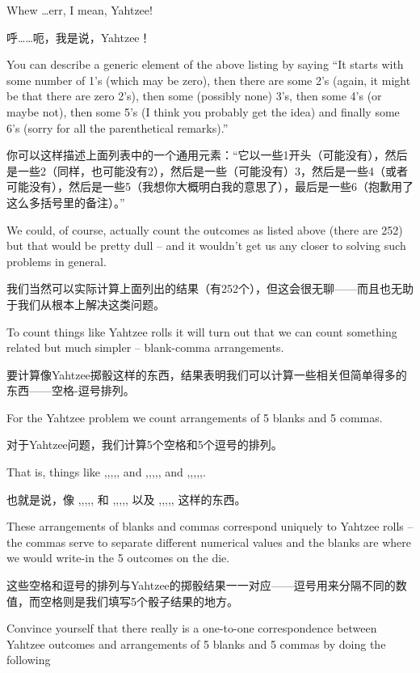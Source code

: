 Whew \ldots err, I mean, Yahtzee!

呼……呃，我是说，Yahtzee！

You can describe a generic element of the above listing by saying ``It starts
with some number of 1's (which may be zero), then there are some 2's (again,
it might be that there are zero 2's),  then some (possibly none) 3's, 
then some 4's (or maybe not), then some
5's (I think you probably get the idea) and finally some 6's (sorry for 
all the parenthetical remarks).''  

你可以这样描述上面列表中的一个通用元素：“它以一些1开头（可能没有），然后是一些2（同样，也可能没有2），然后是一些（可能没有）3，然后是一些4（或者可能没有），然后是一些5（我想你大概明白我的意思了），最后是一些6（抱歉用了这么多括号里的备注）。”

We could, of course, actually count the 
outcomes as listed above (there are 252) but that would be pretty dull -- and
it wouldn't get us any closer to solving such problems in general.

我们当然可以实际计算上面列出的结果（有252个），但这会很无聊——而且也无助于我们从根本上解决这类问题。

To 
count things like Yahtzee rolls it will turn out that we can count something
related but much simpler -- blank-comma arrangements.

要计算像Yahtzee掷骰这样的东西，结果表明我们可以计算一些相关但简单得多的东西——空格-逗号排列。

For the Yahtzee
problem we count arrangements of 5 blanks and 5 commas.

对于Yahtzee问题，我们计算5个空格和5个逗号的排列。

That is,
things like {\LARGE \blnk\blnk,\blnk,,\blnk,\blnk,} and 
{\LARGE \blnk\blnk\blnk\blnk\blnk,,,,,} and 
{\LARGE ,,,\blnk\blnk\blnk\blnk\blnk,,}.

也就是说，像 {\LARGE \blnk\blnk,\blnk,,\blnk,\blnk,} 和 {\LARGE \blnk\blnk\blnk\blnk\blnk,,,,,} 以及 {\LARGE ,,,\blnk\blnk\blnk\blnk\blnk,,} 这样的东西。

These arrangements of blanks and commas correspond uniquely to Yahtzee
rolls -- the commas serve to separate different numerical values
and the blanks are where we would write-in the 5 outcomes on the die.

这些空格和逗号的排列与Yahtzee的掷骰结果一一对应——逗号用来分隔不同的数值，而空格则是我们填写5个骰子结果的地方。

Convince yourself that there really is a one-to-one correspondence
between Yahtzee outcomes and arrangements of 5 blanks and 5 commas
by doing the following

